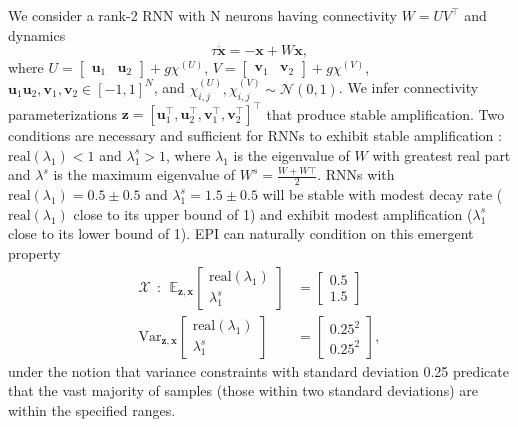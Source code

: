 \documentclass[11pt]{article}
\begin{document}
We consider a rank-2 RNN with N neurons having connectivity $W = UV^\top$
 and dynamics
 \begin{equation}
 \tau \dot{\mathbf{x}} = -\mathbf{x} + W\mathbf{x},
 \end{equation}
where $U = \begin{bmatrix} \mathbf{u}_1 & \mathbf{u}_2 \end{bmatrix} + g \chi^{(U)}$, $V = \begin{bmatrix} \mathbf{v}_1 & \mathbf{v}_2 \end{bmatrix} + g\chi^{(V)}$, $\mathbf{u}_1 \mathbf{u}_2, \mathbf{v}_1, \mathbf{v}_2 \in \left[-1, 1 \right]^N$, and $\chi^{(U)}_{i,j}, \chi^{(V)}_{i,j} \sim \mathcal{N}(0, 1)$.
We infer connectivity parameterizations $\mathbf{z} = \left[\mathbf{u}_1^\top, \mathbf{u}_2^\top, \mathbf{v}_1^\top, \mathbf{v}_2^\top \right]^\top$   that produce stable amplification.
Two conditions are necessary and sufficient for RNNs to exhibit stable amplification \cite{bondanelli2020coding}:  $\text{real}(\lambda_1) < 1$ and
$\lambda^s_1 > 1$, where $\lambda_1$ is the eigenvalue of $W$ with greatest real part and $\lambda^s$ is the maximum eigenvalue of $W^s = \frac{W + W\top}{2}$.
RNNs  with $\text{real}(\lambda_1) = 0.5 \pm 0.5$ and $\lambda_1^s = 1.5 \pm 0.5$ will be stable with modest decay rate ($\text{real}(\lambda_1)$ close to its upper bound of 1) and exhibit modest amplification ($\lambda_1^s$ close to its lower bound of 1).
 EPI can naturally condition on this emergent property
\begin{equation}\label{eq:EP_LRRNN}
\begin{split}
\mathcal{X} ~~:~~ \mathbb{E}_{\mathbf{z}, \mathbf{x}} \begin{bmatrix} \text{real}(\lambda_1) \\ \lambda^s_1 \end{bmatrix} &= \begin{bmatrix} 0.5 \\ 1.5 \end{bmatrix} \\
\text{Var}_{\mathbf{z}, \mathbf{x}} \begin{bmatrix} \text{real}(\lambda_1) \\ \lambda^s_1 \end{bmatrix} &= \begin{bmatrix} 0.25^2 \\ 0.25^2 \end{bmatrix},
\end{split}
\end{equation}
under the notion that variance constraints with standard deviation 0.25 predicate that the vast majority of samples (those within two standard deviations) are within the specified ranges.
\end{document}
